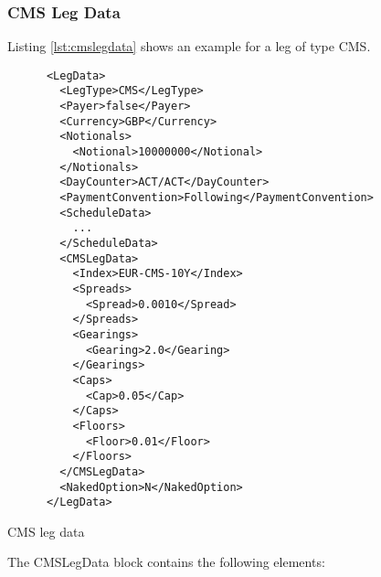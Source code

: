\subsubsection{CMS Leg Data}
\label{ss:cmslegdata}

Listing \ref{lst:cmslegdata} shows an example for a leg of type CMS. 

\begin{listing}[H]
\begin{verbatim}
      <LegData>
        <LegType>CMS</LegType>
        <Payer>false</Payer>
        <Currency>GBP</Currency>
        <Notionals>
          <Notional>10000000</Notional>
        </Notionals>
        <DayCounter>ACT/ACT</DayCounter>
        <PaymentConvention>Following</PaymentConvention>
        <ScheduleData>
          ...
        </ScheduleData>
        <CMSLegData>
          <Index>EUR-CMS-10Y</Index>
          <Spreads>
            <Spread>0.0010</Spread>
          </Spreads>
          <Gearings>
            <Gearing>2.0</Gearing>
          </Gearings>
          <Caps>
            <Cap>0.05</Cap>
          </Caps>
          <Floors>
            <Floor>0.01</Floor>
          </Floors>
        </CMSLegData>
        <NakedOption>N</NakedOption>
      </LegData>
\end{verbatim}
\caption{CMS leg data}
\label{lst:cmslegdata}
\end{listing}
 
The CMSLegData block contains the following elements:

